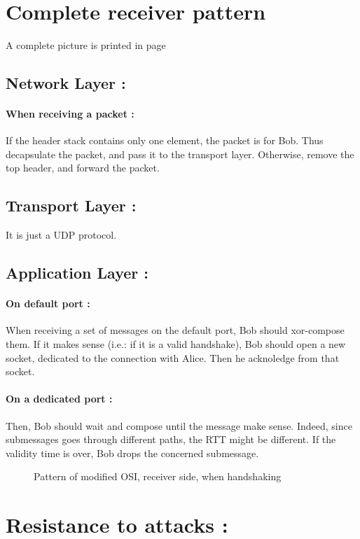 \documentclass[a4paper, onecolumn, 10pt]{article}
\numberwithin{equation}{section}
\begin{document}
\section{Complete receiver pattern}
A complete picture is printed in page \pageref{fig:OSImodified2}
\subsection{Network Layer :}
\paragraph{When receiving a packet :}
If the header stack contains only one element, the packet is for Bob. Thus decapsulate the packet, and pass it to the transport layer. Otherwise, remove the top header, and forward the packet. 
\subsection{Transport Layer :}
It is just a UDP protocol.
\subsection{Application Layer :}
\paragraph{On default port :}
When receiving a set of messages on the default port, Bob should xor-compose them. If it makes sense (i.e.: if it is a valid handshake), Bob should open a new socket, dedicated to the connection with Alice. Then he acknoledge from that socket. 
\paragraph{On a dedicated port :}
Then, Bob should wait and compose until the message make sense. Indeed, since submessages goes through different paths, the RTT might be different. If the validity time is over, Bob drops the concerned submessage.
\begin{figure}
  \centering
  \begingroup
  
  \endgroup
  \caption{Pattern of modified OSI, receiver side, when handshaking}
  \label{fig:OSImodified2}
\end{figure}

\section{Resistance to attacks :}
\end{document}
